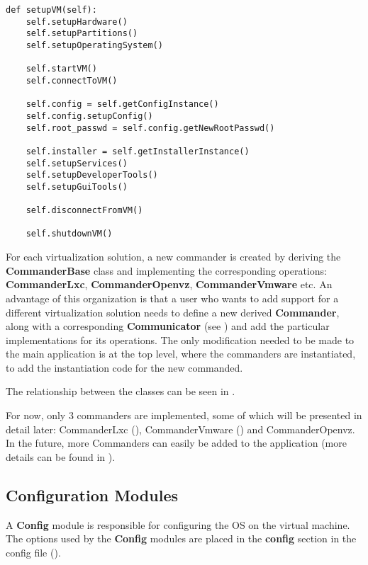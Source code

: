 \lstset{language=Python,caption=Commander sequence of steps,label=lst:commander-seq}
\begin{lstlisting}
def setupVM(self):
	self.setupHardware()
	self.setupPartitions()
	self.setupOperatingSystem()

	self.startVM()
	self.connectToVM()

	self.config = self.getConfigInstance()
	self.config.setupConfig()
	self.root_passwd = self.config.getNewRootPasswd()

	self.installer = self.getInstallerInstance()
	self.setupServices()
	self.setupDeveloperTools()
	self.setupGuiTools()

	self.disconnectFromVM()

	self.shutdownVM()
\end{lstlisting}

For each virtualization solution, a new commander is created by deriving the
\textbf{CommanderBase} class and implementing the corresponding operations:
\textbf{CommanderLxc}, \textbf{CommanderOpenvz}, \textbf{CommanderVmware} etc.
An advantage of this organization is that a user who wants to add support for a
different virtualization solution needs to define a new derived
\textbf{Commander}, along with a corresponding \textbf{Communicator} (see
) and add the particular
implementations for its operations. The only modification needed to be made to
the main application is at the top level, where the commanders are
instantiated, to add the instantiation code for the new commanded.

The relationship between the classes can be seen in .


For now, only 3 commanders are implemented, some of which will be presented in
detail later: CommanderLxc (),
CommanderVmware () and CommanderOpenvz.
In the future, more Commanders can easily be added to the application (more
details can be found in ).

\subsection{Configuration Modules}
\label{sub-sec:configs}
A \textbf{Config} module is responsible for configuring the OS on the virtual
machine. The options used by the \textbf{Config} modules are placed in the
\textbf{config} section in the config file
().

